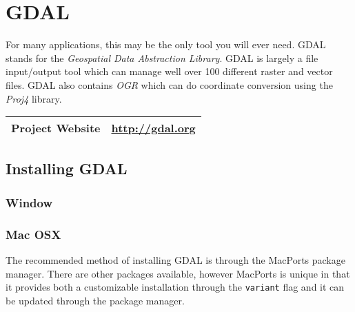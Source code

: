 %


\section*{GDAL}

For many applications, this may be the only tool you will ever need.  GDAL
stands for the \emph{Geospatial Data Abstraction Library}.  GDAL is largely 
a file input/output tool which can manage well over 100 different raster and vector
files.  GDAL also contains \emph{OGR} which can do coordinate conversion
using the \emph{Proj4} library.


\begin{table}[h!]
\begin{tabular}{l c}\hline
Project Website & \url{http://gdal.org} \\\hline
\end{tabular}
\end{table}


\subsection*{Installing GDAL}


\subsubsection*{Window}



\subsubsection*{Mac OSX}

The recommended method of installing GDAL is through the MacPorts package manager.
There are other packages available, however MacPorts is unique in that it provides both a customizable
installation through the \texttt{variant} flag and it can be updated through
the package manager.


